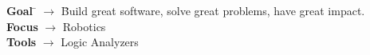 

\begin{tabbing}

\textbf{Goal}
\quad \= $\rightarrow$ \quad \=
Build great software, solve great problems, have great impact.
\\

\textbf{Focus}
\> $\rightarrow$ \>
Robotics
\\

\textbf{Tools}
\> $\rightarrow$ \>
Logic Analyzers

\end{tabbing}







